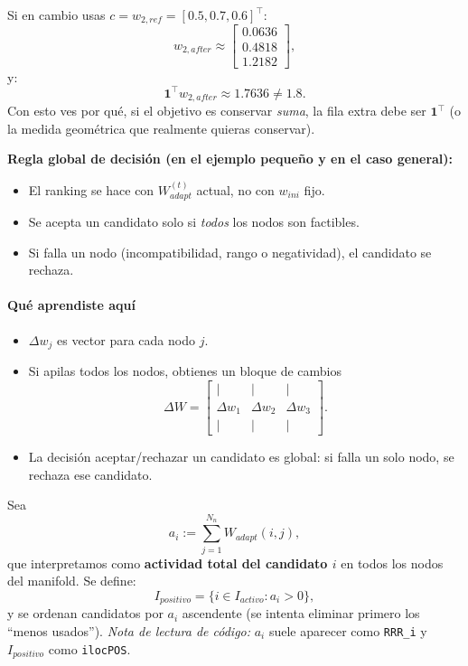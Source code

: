 \documentclass[11pt,a4paper]{article}
\begin{document}
Si en cambio usas $c=w_{2,ref}=[0.5,0.7,0.6]^\top$:
\[
w_{2,after}\approx
\begin{bmatrix}
0.0636\\0.4818\\1.2182
\end{bmatrix},
\]
y:
\[
\mathbf 1^\top w_{2,after}\approx 1.7636 \neq 1.8.
\]
Con esto ves por qué, si el objetivo es conservar \emph{suma}, la fila extra debe
ser $\mathbf 1^\top$ (o la medida geométrica que realmente quieras conservar).

\textbf{Regla global de decisión (en el ejemplo pequeño y en el caso general):}
\begin{itemize}[leftmargin=1.5em]
\item El ranking se hace con $W_{adapt}^{(t)}$ actual, no con $w_{ini}$ fijo.
\item Se acepta un candidato solo si \emph{todos} los nodos son factibles.
\item Si falla un nodo (incompatibilidad, rango o negatividad), el candidato se rechaza.
\end{itemize}

\paragraph{Qué aprendiste aquí}
\begin{itemize}[leftmargin=1.5em]
\item $\Delta w_j$ es vector para cada nodo $j$.
\item Si apilas todos los nodos, obtienes un bloque de cambios
\[
\Delta W=
\begin{bmatrix}
\vert&\vert&\vert\\
\Delta w_1&\Delta w_2&\Delta w_3\\
\vert&\vert&\vert
\end{bmatrix}.
\]
\item La decisión aceptar/rechazar un candidato es global:
si falla un solo nodo, se rechaza ese candidato.
\end{itemize}

Sea
\[
a_i:=\sum_{j=1}^{N_n}W_{adapt}(i,j),
\]
que interpretamos como \textbf{actividad total del candidato $i$} en todos los nodos
del manifold.
Se define:
\[
I_{positivo}=\{i\in I_{activo}:a_i>0\},
\]
y se ordenan candidatos por $a_i$ ascendente (se intenta eliminar primero los ``menos usados'').
\textit{Nota de lectura de código:} $a_i$ suele aparecer como \texttt{RRR\_i} y
$I_{positivo}$ como \texttt{ilocPOS}.
\end{document}
